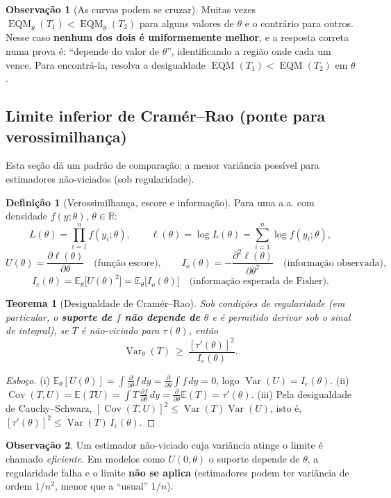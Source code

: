 \documentclass[11pt,a4paper]{article}
\theoremstyle{definition}
\newtheorem{definicao}{Definição}[section]
\newtheorem{observacao}{Observação}[section]
\theoremstyle{plain}
\newtheorem{teorema}{Teorema}[section]
\newcommand{\E}{\mathbb{E}}
\newcommand{\Var}{\operatorname{Var}}
\newcommand{\Cov}{\operatorname{Cov}}
\newcommand{\EQM}{\operatorname{EQM}}
\newcommand{\R}{\mathbb{R}}
\begin{document}
\begin{observacao}[As curvas podem se cruzar]
Muitas vezes $\EQM_\theta(T_1)<\EQM_\theta(T_2)$ para alguns valores de $\theta$ e o contrário para outros. Nesse caso \textbf{nenhum dos dois é uniformemente melhor}, e a resposta correta numa prova é: ``depende do valor de $\theta$'', identificando a região onde cada um vence. Para encontrá-la, resolva a desigualdade $\EQM(T_1)<\EQM(T_2)$ em $\theta$.
\end{observacao}

\subsection{Limite inferior de Cramér--Rao (ponte para verossimilhança)}

Esta seção dá um padrão de comparação: a menor variância possível para estimadores não-viciados (sob regularidade).

\begin{definicao}[Verossimilhança, escore e informação]
Para uma a.a. com densidade $f(y;\theta)$, $\theta\in\R$:
\[
L(\theta)=\prod_{i=1}^n f(y_i;\theta),\qquad
\ell(\theta)=\log L(\theta)=\sum_{i=1}^n\log f(y_i;\theta),
\]
\[
U(\theta)=\frac{\partial \ell(\theta)}{\partial\theta}\quad\text{(função escore)},\qquad
I_o(\theta)=-\frac{\partial^2 \ell(\theta)}{\partial\theta^2}\quad\text{(informação observada)},
\]
\[
I_e(\theta)=\E_\theta\big[U(\theta)^2\big]=\E_\theta\big[I_o(\theta)\big]\quad\text{(informação esperada de Fisher)}.
\]
\end{definicao}

\begin{teorema}[Desigualdade de Cramér--Rao]
Sob condições de regularidade (em particular, o \textbf{suporte de $f$ não depende de $\theta$} e é permitido derivar sob o sinal de integral), se $T$ é não-viciado para $\tau(\theta)$, então
\[
\Var_\theta(T)\ \ge\ \frac{[\tau'(\theta)]^2}{I_e(\theta)} .
\]
\end{teorema}
\begin{proof}[Esboço]
(i) $\E_\theta[U(\theta)]=\int \frac{\partial}{\partial\theta}f\,dy=\frac{\partial}{\partial\theta}\int f\,dy=0$, logo $\Var(U)=I_e(\theta)$.
(ii) $\Cov(T,U)=\E(TU)=\int T\,\frac{\partial f}{\partial\theta}\,dy=\frac{\partial}{\partial\theta}\E(T)=\tau'(\theta)$.
(iii) Pela desigualdade de Cauchy--Schwarz, $[\Cov(T,U)]^2\le\Var(T)\Var(U)$, isto é, $[\tau'(\theta)]^2\le\Var(T)\,I_e(\theta)$.
\end{proof}

\begin{observacao}
Um estimador não-viciado cuja variância atinge o limite é chamado \emph{eficiente}. Em modelos como $U(0,\theta)$ o suporte depende de $\theta$, a regularidade falha e o limite \textbf{não se aplica} (estimadores podem ter variância de ordem $1/n^2$, menor que a ``usual'' $1/n$).
\end{observacao}
\end{document}
